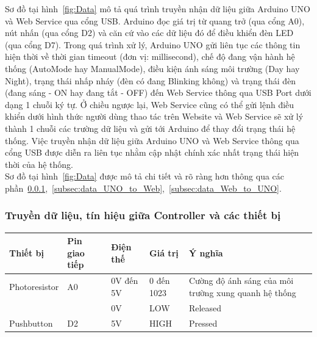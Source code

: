 {Sơ đồ tại hình~\ref{fig:Data} mô tả quá trình truyền nhận dữ liệu giữa Arduino UNO và Web Service qua cổng USB. Arduino đọc giá trị từ quang trở (qua cổng A0), nút nhấn (qua cổng D2) và căn cứ vào các dữ liệu đó để điều khiển đèn LED (qua cổng D7). Trong quá trình xử lý, Arduino UNO gửi liên tục các thông tin hiện thời về thời gian timeout (đơn vị: millisecond), chế độ đang vận hành hệ thống (AutoMode hay ManualMode), điều kiện ánh sáng môi trường (Day hay Night), trạng thái nhấp nháy (đèn có đang Blinking không) và trạng thái đèn (đang sáng - ON hay đang tắt - OFF) đến Web Service thông qua USB Port dưới dạng 1 chuỗi ký tự. Ở chiều ngược lại, Web Service cũng có thể gửi lệnh điều khiển dưới hình thức người dùng thao tác trên Website và Web Service sẽ xử lý thành 1 chuỗi các trường dữ liệu và gửi tới Arduino để thay đổi trạng thái hệ thống. Việc truyền nhận dữ liệu giữa Arduino UNO và Web Service thông qua cổng USB được diễn ra liên tục nhằm cập nhật chính xác nhất trạng thái hiện thời của hệ thống. \\

Sơ đồ tại hình~\ref{fig:Data} được mô tả chi tiết và rõ ràng hơn thông qua các phần~\ref{subsec:data_in_UNO},~\ref{subsec:data_UNO_to_Web},~\ref{subsec:data_Web_to_UNO}.

\subsubsection{Truyền dữ liệu, tín hiệu giữa Controller và các thiết bị}\label{subsec:data_in_UNO}
\begin{table}[H]
\centering
\small
\begin{tabular}{|p{2.5cm}|p{2.5cm}|p{2.5cm}|p{2.5cm}|p{4.5cm}|}
\hline
{\textbf{Thiết bị}}            & {\textbf{Pin giao tiếp}} & {\textbf{Điện thế}} & {\textbf{Giá trị}} & {\textbf{Ý nghĩa}}                                 \\ \hline
{Photoresistor}                & {A0}                     & {0V đến 5V}         & {0 đến 1023}       & {Cường độ ánh sáng của môi trường xung quanh hệ thống} \\ \hline
{}                             & {}                       & {0V}                & {LOW}              & {Released}                                         \\ \cline{3-5} 
\multirow{-2}{*}{{Pushbutton}} & \multirow{-2}{*}{{D2}}   & {5V}                & {HIGH}             & {Pressed}                                          \\ \hline


\end{tabular}
\end{table}}
